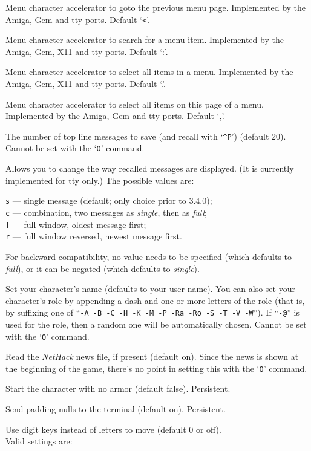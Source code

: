 \item[\ib{menu\verb+_+previous\verb+_+page}]
Menu character accelerator to goto the previous menu page.
Implemented by the Amiga, Gem and tty ports.
Default `\verb+<+'.
\item[\ib{menu\verb+_+search}]
Menu character accelerator to search for a menu item.
Implemented by the Amiga, Gem, X11 and tty ports.
Default `:'.
\item[\ib{menu\verb+_+select\verb+_+all}]
Menu character accelerator to select all items in a menu.
Implemented by the Amiga, Gem, X11 and tty ports.
Default `.'.
\item[\ib{menu\verb+_+select\verb+_+page}]
Menu character accelerator to select all items on this page of a menu.
Implemented by the Amiga, Gem and tty ports.
Default `,'.
\item[\ib{msghistory}]
The number of top line messages to save (and recall with `{\tt \^{}P}')
(default 20). Cannot be set with the `{\tt O}' command.
\item[\ib{msg\verb+_+window}]
Allows you to change the way recalled messages are displayed.
(It is currently implemented for tty only.) The possible values are:

{\tt s} --- single message (default; only choice prior to 3.4.0);\\
{\tt c} --- combination, two messages as {\it single\/}, then as {\it full\/};\\
{\tt f} --- full window, oldest message first;\\
{\tt r} --- full window reversed, newest message first.

For backward compatibility, no value needs to be specified (which
defaults to {\it full\/}), or it can be negated (which defaults
to {\it single\/}). 
\item[\ib{name}]
Set your character's name (defaults to your user name).  You can also
set your character's role by appending a dash and one or more letters of
the role (that is, by suffixing one of
``{\tt -A -B -C -H -K -M -P -Ra -Ro -S -T -V -W}'').
If ``{\tt -@}'' is used for the role, then a random one will be
automatically chosen.
Cannot be set with the `{\tt O}' command.
\item[\ib{news}]
Read the {\it NetHack\/} news file, if present (default on).
Since the news is shown at the beginning of the game, there's no point
in setting this with the `{\tt O}' command.
\item[\ib{nudist}]
Start the character with no armor (default false).  Persistent.
\item[\ib{null}]
Send padding nulls to the terminal (default on).  Persistent.
\item[\ib{number\verb+_+pad}]
Use digit keys instead of letters to move (default 0 or off).\\
Valid settings are:

